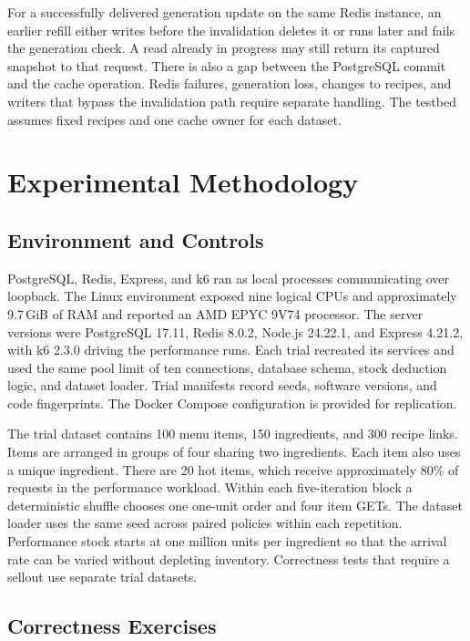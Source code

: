 \documentclass[conference]{IEEEtran}
\begin{document}
For a successfully delivered generation update on the same Redis instance, an earlier refill either writes before the invalidation deletes it or runs later and fails the generation check. A read already in progress may still return its captured snapshot to that request. There is also a gap between the PostgreSQL commit and the cache operation. Redis failures, generation loss, changes to recipes, and writers that bypass the invalidation path require separate handling. The testbed assumes fixed recipes and one cache owner for each dataset.

\section{Experimental Methodology}

\subsection{Environment and Controls}

PostgreSQL, Redis, Express, and k6 ran as local processes communicating over loopback. The Linux environment exposed nine logical CPUs and approximately 9.7\,GiB of RAM and reported an AMD EPYC 9V74 processor. The server versions were PostgreSQL 17.11, Redis 8.0.2, Node.js 24.22.1, and Express 4.21.2, with k6 2.3.0 driving the performance runs. Each trial recreated its services and used the same pool limit of ten connections, database schema, stock deduction logic, and dataset loader. Trial manifests record seeds, software versions, and code fingerprints. The Docker Compose configuration is provided for replication.

The trial dataset contains 100 menu items, 150 ingredients, and 300 recipe links. Items are arranged in groups of four sharing two ingredients. Each item also uses a unique ingredient. There are 20 hot items, which receive approximately 80\% of requests in the performance workload. Within each five-iteration block a deterministic shuffle chooses one one-unit order and four item GETs. The dataset loader uses the same seed across paired policies within each repetition. Performance stock starts at one million units per ingredient so that the arrival rate can be varied without depleting inventory. Correctness tests that require a sellout use separate trial datasets.

\subsection{Correctness Exercises}
\end{document}
